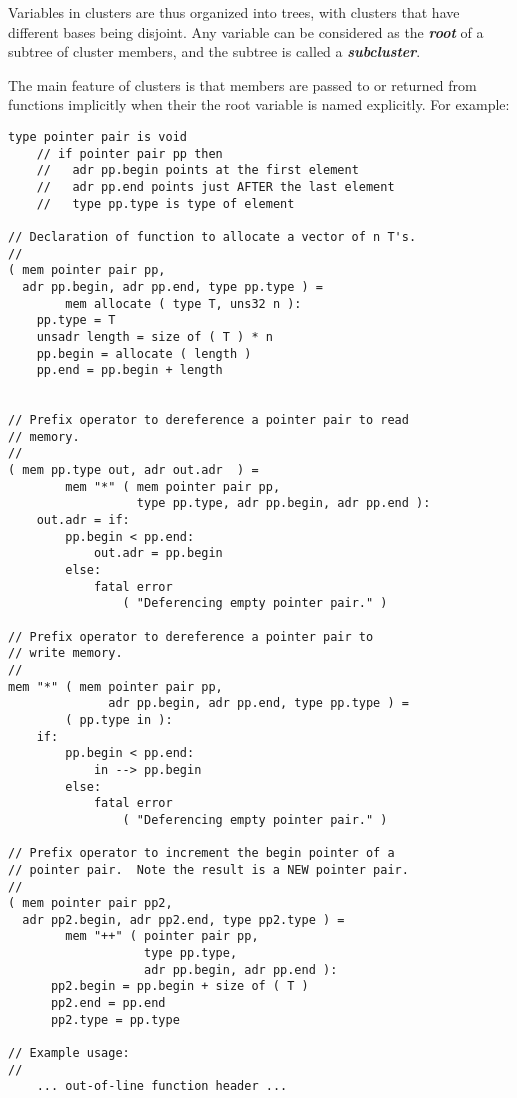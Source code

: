 \documentclass[12pt]{article}
\newcommand{\key}[1]{{\bf \em #1}\index{#1}}
\newcommand{\mkey}[2]{{\bf \em #1}\index{#1!#2}}
\newenvironment{indpar}[1][0.3in]%
	{\begin{list}{}%
		     {\setlength{\itemsep}{0in}%
		      \setlength{\topsep}{0in}%
		      \setlength{\parsep}{1ex}%
		      \setlength{\labelwidth}{#1}%
		      \setlength{\leftmargin}{#1}%
		      \addtolength{\leftmargin}{\labelsep}}%
	 \item}%
	{\end{list}}
\begin{document}
Variables in clusters are thus organized into trees, with clusters
that have different bases being disjoint.  Any variable can be considered
as the \mkey{root}{of cluster} of a subtree of cluster members, and
the subtree is called a \key{subcluster}.

The main feature of clusters is that members are passed to or returned
from functions implicitly when their the root variable is named
explicitly.  For example:
\begin{indpar}\begin{verbatim}
type pointer pair is void
    // if pointer pair pp then
    //   adr pp.begin points at the first element
    //   adr pp.end points just AFTER the last element
    //   type pp.type is type of element

// Declaration of function to allocate a vector of n T's.
//
( mem pointer pair pp,
  adr pp.begin, adr pp.end, type pp.type ) =
        mem allocate ( type T, uns32 n ):
    pp.type = T
    unsadr length = size of ( T ) * n
    pp.begin = allocate ( length )
    pp.end = pp.begin + length


// Prefix operator to dereference a pointer pair to read
// memory.
//
( mem pp.type out, adr out.adr  ) =
        mem "*" ( mem pointer pair pp,
                  type pp.type, adr pp.begin, adr pp.end ):
    out.adr = if:
        pp.begin < pp.end:
            out.adr = pp.begin
        else:
            fatal error
                ( "Deferencing empty pointer pair." )

// Prefix operator to dereference a pointer pair to
// write memory.
//
mem "*" ( mem pointer pair pp,
              adr pp.begin, adr pp.end, type pp.type ) =
        ( pp.type in ):
    if:
        pp.begin < pp.end:
            in --> pp.begin
        else:
            fatal error
                ( "Deferencing empty pointer pair." )

// Prefix operator to increment the begin pointer of a
// pointer pair.  Note the result is a NEW pointer pair.
//
( mem pointer pair pp2,
  adr pp2.begin, adr pp2.end, type pp2.type ) =
        mem "++" ( pointer pair pp,
                   type pp.type,
                   adr pp.begin, adr pp.end ):
      pp2.begin = pp.begin + size of ( T )
      pp2.end = pp.end
      pp2.type = pp.type

// Example usage:
//
    ... out-of-line function header ...


\end{verbatim}
\end{indpar}
\end{document}
